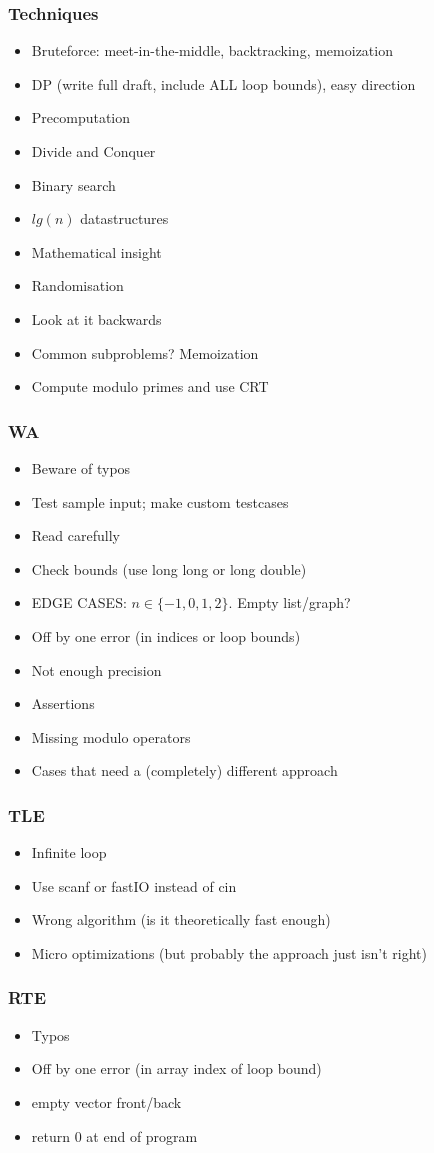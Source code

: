 \documentclass[
	a4paper,
	landscape,
	10pt,
	article
]{article}
\begin{document}
\subsubsection*{Techniques}
\begin{itemize}
\setlength\itemsep{0em}
	\item Bruteforce: meet-in-the-middle, backtracking, memoization
	\item DP (write full draft, include ALL loop bounds), easy direction
	\item Precomputation
	\item Divide and Conquer
	\item Binary search
	\item $lg(n)$ datastructures
	\item Mathematical insight
	\item Randomisation
	\item Look at it backwards
	\item Common subproblems? Memoization
	\item Compute modulo primes and use CRT
\end{itemize}

\subsubsection*{WA}
\begin{itemize}
	\setlength\itemsep{0em}
	\item Beware of typos
	\item Test sample input; make custom testcases
	\item Read carefully
	\item Check bounds (use long long or long double)
	\item EDGE CASES: $n\in\{-1,0,1,2\}$. Empty list/graph?
	\item Off by one error (in indices or loop bounds)
	\item Not enough precision
	\item Assertions
	\item Missing modulo operators
	\item Cases that need a (completely) different approach
\end{itemize}

\subsubsection*{TLE}
\begin{itemize}
	\setlength\itemsep{0em}
	\item Infinite loop
	\item Use scanf or fastIO instead of cin
	\item Wrong algorithm (is it theoretically fast enough)
	\item Micro optimizations (but probably the approach just isn't right)
\end{itemize}

\subsubsection*{RTE}
\begin{itemize}
	\setlength\itemsep{0em}
	\item Typos
	\item Off by one error (in array index of loop bound)
	\item empty vector front/back
	\item return 0 at end of program
\end{itemize}
\end{document}
